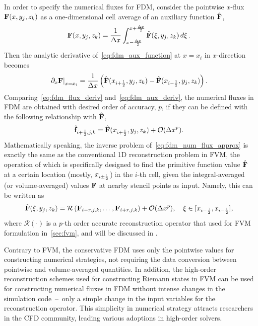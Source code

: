 In order to specify the numerical fluxes for FDM, consider the pointwise \( x \)-flux \( \mathbf{F} (x, y_{j}, z_{k}) \)
as a one-dimensional cell average of an auxiliary function \( \hat{\mathbf{F}} \),
\begin{equation}\label{eq:fdm_aux_function}
    \mathbf{F}(x,y_j,z_k) = \frac{1}{\Delta x} \int_{x - \frac{\Delta x}{2}}^{x + \frac{\Delta x}{2}} \hat{\mathbf{F}}(\xi, y_j, z_k) \mathop{d\xi}.
\end{equation}
Then the analytic derivative of~\cref{eq:fdm_aux_function} at \( x = x_{i} \) in \( x \)-direction becomes
\begin{equation}\label{eq:fdm_aux_deriv}
    \left. \partial_{x} \mathbf{F} \right|_{x=x_{i}} =
    \frac{1}{\Delta x} \left(\hat{\mathbf{F}}(x_{{i+\frac{1}{2}}}, y_j, z_k) - \hat{\mathbf{F}}(x_{{i-\frac{1}{2}}}, y_j, z_k) \right).
\end{equation}
Comparing~\cref{eq:fdm_flux_deriv} and~\cref{eq:fdm_aux_deriv},
the numerical fluxes in FDM are obtained with desired order of accuracy, \( p \),
if they can be defined with
the following relationship with $\hat{\mathbf{F}}$,
\begin{equation}\label{eq:fdm_num_flux_approx}
    \hat{\mathbf{f}}_{{i+\frac{1}{2}},j,k} = \hat{\mathbf{F}} (x_{{i+\frac{1}{2}}},y_j,z_k) + \mathcal{O} (\Delta x^{p}).
\end{equation}
Mathematically speaking, the inverse problem of~\cref{eq:fdm_num_flux_approx} is exactly the same as
the conventional 1D reconstruction problem in FVM, the operation of which is specifically designed to
find the primitive function value $\hat{\mathbf{F}}$ at a certain location (mostly, $x_{i \pm \frac{1}{2}}$) in the $i$-th cell,
given the integral-averaged (or volume-averaged) values ${\mathbf{F}}$ at nearby stencil points
as input. Namely, this can be written as
\begin{equation}\label{eq:fdm_recon}
    \hat{\mathbf{F}}(\xi,y_j,z_k) = \mathcal{R}\left(\mathbf{F}_{i-r,j,k}, \dots, \mathbf{F}_{i+r,j,k}\right) + \mathcal{O} (\Delta x^p),
    \quad
    \xi \in [x_{{i-\frac{1}{2}}}, x_{{i-\frac{1}{2}}}],
\end{equation}
where \( \mathcal{R}(\cdot) \) is a $p$-th order accurate reconstruction operator
that used for FVM formulation in~\cref{sec:fvm}, and will be discussed in .

Contrary to FVM, the conservative FDM uses only the pointwise values for constructing numerical strategies,
not requiring the data conversion between pointwise and volume-averaged quantities.
In addition, the high-order reconstruction schemes used for constructing Riemann states in FVM
can be used for constructing numerical fluxes in FDM
without intense changes in the simulation code~--~only a simple change in the input variables for the reconstruction operator.
This simplicity in numerical strategy attracts researchers in the CFD community, leading various adoptions in
high-order solvers.~\cite{jiang1996efficient,shu1998essentially,mignone2010high,christlieb2015picard,seal2016explicit}

